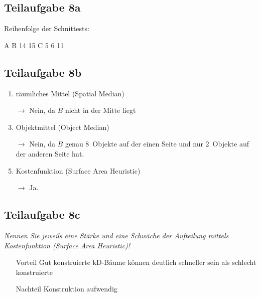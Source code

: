 \documentclass[a4paper]{scrartcl}
\begin{document}
\subsection*{Teilaufgabe 8a}

Reihenfolge der Schnittests:

A B 14 15 C 5 6 11

\subsection*{Teilaufgabe 8b}
\begin{enumerate}
    \item räumliches Mittel (Spatial Median)
    \item[$\rightarrow$] Nein, da $B$ nicht in der Mitte liegt
    \item Objektmittel (Object Median)
    \item[$\rightarrow$] Nein, da $B$ genau 8~Objekte auf der einen Seite und
                         nur 2~Objekte auf der anderen Seite hat.
    \item Kostenfunktion (Surface Area Heuristic)
    \item[$\rightarrow$] Ja.
\end{enumerate}

\subsection*{Teilaufgabe 8c}
\textit{Nennen Sie jeweils eine Stärke und eine Schwäche der Aufteilung mittels Kostenfunktion (Surface Area Heuristic)!}

\begin{itemize}
    \item[Vorteil] Gut konstruierte kD-Bäume können deutlich schneller sein als schlecht konstruierte
    \item[Nachteil] Konstruktion aufwendig
\end{itemize}
\end{document}

